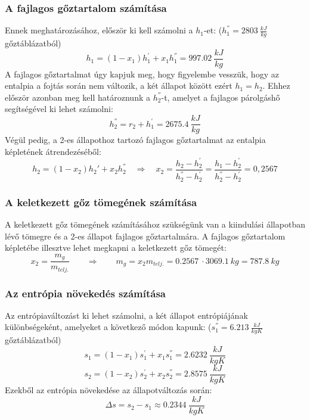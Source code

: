 \subsubsection{A fajlagos gőztartalom számítása}
Ennek meghatározásához, először ki kell számolni a $h_{1}$-et: ($h_{1}^{''} = \SI{2803}{\frac{kJ}{kg}}$ gőztáblázatból)
\begin{equation}
	h_{1}
	=
	(1 - x_{1})h_{1}^{'} + x_{1}h_{1}^{''}
	=
	\SI{997,02}{\dfrac{kJ}{kg}}
\end{equation}
A fajlagos gőztartalmat úgy kapjuk meg, hogy figyelembe vesszük, hogy az entalpia a fojtás során nem változik, a két állapot között ezért $h_{1} = h_{2}$. Ehhez először azonban meg kell határoznunk a $h_{2}^{''}$-t, amelyet a fajlagos párolgáshő segítségével ki lehet számolni:
\begin{equation}
	h_{2}^{''} = r_{2} + h_{1}^{'}
	=
	\SI{2675,4}{\dfrac{kJ}{kg}}
\end{equation}
Végül pedig, a 2-es állapothoz tartozó fajlagos gőztartalmat az entalpia képletének átrendezéséből:
\begin{equation}
	h_{2} = \left(1 - x_{2}\right) h_{2}' + x_{2} h_{2}^{''}
	\quad 
	\Rightarrow
	\quad 
	x_{2}
	= 
	\dfrac{h_{2} - h_{2}^{'}}{h_{2}^{''} - h_{2}^{'}} 
	=
	\dfrac{h_{1} - h_{2}^{'}}{h_{2}^{''} - h_{2}^{'}} 
	= 
	0,2567
\end{equation}

\subsubsection{A keletkezett gőz tömegének számítása}
A keletkezett gőz tömegének számításához szükségünk van a kiindulási állapotban lévő tömegre és a 2-es állapot fajlagos gőztartalmára. A fajlagos gőztartalom képletébe illesztve lehet megkapni a keletkezett gőz tömegét:
\begin{equation}
	x_{2} = \dfrac{m_{g}}{m_{telj.}}
	\qquad
	\Rightarrow
	\qquad
	m_{g} = x_{2}m_{telj.}
	=
	\SI{0,2567}{}\cdot\SI{3069,1}{kg}
	=
	\SI{787,8}{kg}
\end{equation}


\subsubsection{Az entrópia növekedés számítása}
Az entrópiaváltozást ki lehet számolni, a két állapot entrópiájának különbségeként, amelyeket a következő módon kapunk:
($s_{1}^{''} = \SI{6,213}{\frac{kJ}{kgK}}$ gőztáblázatból)
\begin{equation}
	s_{1}
	=
	(1-x_{1})s_{1}^{'}+x_{1}s_{1}^{''}
	=
	\SI{2,6232}{\dfrac{kJ}{kgK}}
\end{equation}
\begin{equation}
	s_{2}
	=
	(1-x_{2})s_{2}^{'}+x_{2}s_{2}^{''}
	=
	\SI{2,8575}{\dfrac{kJ}{kgK}}
\end{equation}
Ezekből az entrópia növekedése az állapotváltozás során:
\begin{equation}
	\Delta s = s_{2}-s_{1}\approx \SI{0,2344}{\frac{kJ}{kgK}}
\end{equation}

